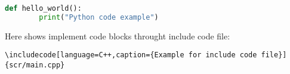 \documentclass{qmes-template}
\begin{document}

\begin{lstlisting}[language=Python,caption={Example Code 2}] 
    def hello_world():
        print("Python code example") 
\end{lstlisting}

Here shows implement code blocks throught include code file:
\begin{lstlisting}[caption={The Implementing of Code Block Below}]
\includecode[language=C++,caption={Example for include code file}]{scr/main.cpp}
\end{lstlisting}
\end{document}
